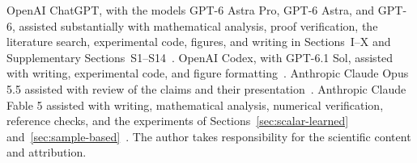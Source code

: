 OpenAI ChatGPT, with the models GPT-6 Astra Pro, GPT-6 Astra, and GPT-6,
assisted substantially with mathematical analysis, proof verification,
the literature search, experimental code, figures, and writing in
Sections~I--X and Supplementary Sections~S1--S14~\citep{openai_chatgpt}.
OpenAI Codex, with GPT-6.1 Sol, assisted with writing, experimental code,
and figure formatting~\citep{openai_codex}. Anthropic Claude Opus 5.5
assisted with review of the claims and their presentation~\citep{anthropic_claude}.
Anthropic Claude Fable 5 assisted with writing, mathematical analysis,
numerical verification, reference checks, and the experiments of
Sections~\ref{sec:scalar-learned} and~\ref{sec:sample-based}~\citep{anthropic_claude_fable}.
The author takes responsibility for the scientific content and attribution.
